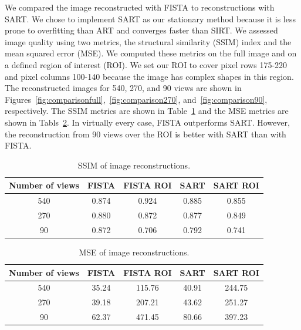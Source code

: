 \documentclass[11pt]{article}
\begin{document}
We compared the image reconstructed with FISTA to reconstructions with SART. We chose to implement SART as our stationary method because it is less prone to overfitting than ART and converges faster than SIRT. We assessed image quality using two metrics, the structural similarity (SSIM) index and the mean squared error (MSE). We computed these metrics on the full image and on a defined region of interest (ROI). We set our ROI to cover pixel rows 175-220 and pixel columns 100-140 because the image has complex shapes in this region. The reconstructed images for 540, 270, and 90 views are shown in Figures~\ref{fig:comparisonfull},~\ref{fig:comparison270}, and~\ref{fig:comparison90}, respectively. The SSIM metrics are shown in Table~\ref{tab:ssim} and the MSE metrics are shown in Tabls~\ref{tab:mse}. In virtually every case, FISTA outperforms SART. However, the reconstruction from 90 views over the ROI is better with SART than with FISTA.

\begin{table}[h]
	\centering
	\begin{tabular}{|c|c|c|c|c|}
		\hline
		\textbf{Number of views} & \textbf{FISTA} & \textbf{FISTA ROI} & \textbf{SART} & \textbf{SART ROI} \\
		\hline
		540 & 0.874 & 0.924 & 0.885 & 0.855 \\
		270 & 0.880 & 0.872 & 0.877 & 0.849 \\
		90  & 0.872 & 0.706 & 0.792 & 0.741 \\
		\hline
	\end{tabular}
	\caption{SSIM of image reconstructions.}
	\label{tab:ssim}
\end{table}

\begin{table}[h]
	\centering
	\begin{tabular}{|c|c|c|c|c|}
		\hline
		\textbf{Number of views} & \textbf{FISTA} & \textbf{FISTA ROI} & \textbf{SART} & \textbf{SART ROI} \\
		\hline
		540 & 35.24 & 115.76 & 40.91 & 244.75 \\
		270 & 39.18 & 207.21 & 43.62 & 251.27 \\
		90  & 62.37 & 471.45 & 80.66 & 397.23 \\
		\hline
	\end{tabular}
	\caption{MSE of image reconstructions.}
	\label{tab:mse}
\end{table}
\end{document}
